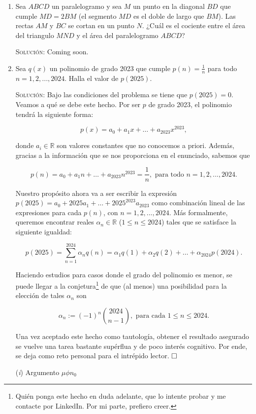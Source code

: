 \documentclass{article}
\begin{document}
\begin{enumerate}
    \item Sea $ABCD$ un paralelogramo y sea $M$ un punto en la diagonal $BD$ que cumple $MD = 2BM$ (el segmento $MD$ es el doble de largo que $BM$).
    Las rectas $AM$ y $BC$ se cortan en un punto $N$. ¿Cuál es el cociente entre el área del triangulo $MND$ y el área del paralelogramo $ABCD$?

    \textsc{Solución}: Coming soon.

    \item Sea $q(x)$ un polinomio de grado 2023 que cumple $p(n) = \frac{1}{n}$ para todo $n = 1, 2, ..., 2024$. Halla el valor de $p(2025)$.

    \textsc{Solución}: Bajo las condiciones del problema se tiene que $p(2025) = 0$. Veamos a qué se debe este hecho. Por ser $p$ de grado 2023, el polinomio tendrá la siguiente forma:

    \[p(x) = a_0 + a_1x + \dots + a_{2023}x^{2023},\]

    donde $a_i \in \mathbb{R}$ son valores constantes que no conocemos a priori. Además, gracias a la información que se nos proporciona en el enunciado, sabemos que

    \[p(n) = a_0 + a_1n + \dots + a_{2023}n^{2023} = \frac{1}{n}, \text{ para todo $n = 1, 2, ..., 2024$}.\]

    Nuestro propósito ahora va a ser escribir la expresión $p(2025) = a_0 + 2025a_1 + \dots + 2025^{2023}a_{2023}$ como combinación lineal de las expresiones para cada $p(n)$, con $n = 1, 2, ..., 2024$.
    Más formalmente, queremos encontrar reales $\alpha_n \in \mathbb{R}$ ($1 \leq n \leq 2024$) tales que se satisface la siguiente igualdad:

    \[p(2025) = \sum_{n = 1}^{2024} \alpha_nq(n) = \alpha_1q(1) + \alpha_2q(2) + \dots + \alpha_{2024}p(2024).\]

    Haciendo estudios para casos donde el grado del polinomio es menor, se puede llegar a la conjetura\footnote{Quién ponga este hecho en duda adelante, que lo intente probar y me contacte por LinkedIn. Por mi parte, prefiero creer.} de que (al menos) una posibilidad para la elección de tales $\alpha_n$ son

    \[\alpha_n := (-1)^{n} \binom{2024}{n-1}, \text{ para cada $1 \leq n \leq 2024$.}\]

    Una vez aceptado este hecho como tautología, obtener el resultado asegurado se vuelve una tarea bastante supérflua y de poco interés cognitivo. Por ende, se deja como reto personal para el intrépido lector. $\hfill\square$

    \item[(\textit{i})] Argumento $\mu\phi n_0$
\end{enumerate}
\end{document}
